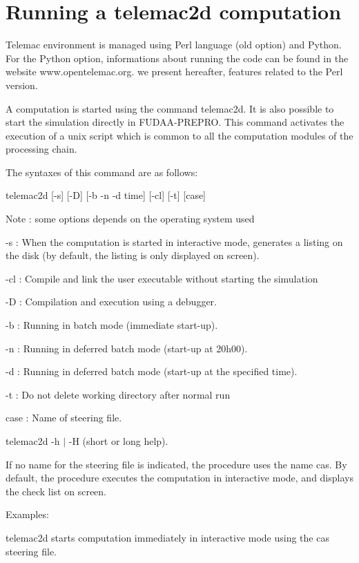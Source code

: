 \chapter{Running a telemac{2d} computation}
\label{tel2d:app1}


 Telemac environment is managed using Perl language (old option) and Python. For the Python option, informations about running the code can be found in the website www.opentelemac.org. we present hereafter, features related to the Perl version.

 A computation is started using the command telemac2d. It is also possible to start the simulation directly in FUDAA-PREPRO. This command activates the execution of a unix script which is common to all the computation modules of the  processing chain.

 The syntaxes of this command are as follows:

 telemac2d [-s] [-D] [-b {\textbar} -n {\textbar} -d time] [-cl] [-t] [case]

 Note : some options depends on the operating system used



 -s : When the computation is started in interactive mode, generates a listing on the disk (by default, the listing is only displayed on screen).

 -cl : Compile and link the user executable without starting the simulation

 -D : Compilation and execution using a debugger.

 -b : Running in batch mode (immediate start-up).

 -n : Running in deferred batch mode (start-up at 20h00).

 -d : Running in deferred batch mode (start-up at the specified time).

 -t : Do not delete working directory after normal run

 case : Name of steering file.



  telemac2d  -h $\mid$ -H  (short or long help).





 If no name for the steering file is indicated, the procedure uses the name cas. By default, the procedure executes the computation in interactive mode, and displays the check list on screen.

 Examples:

 telemac2d starts computation immediately in interactive mode using the cas steering file.


